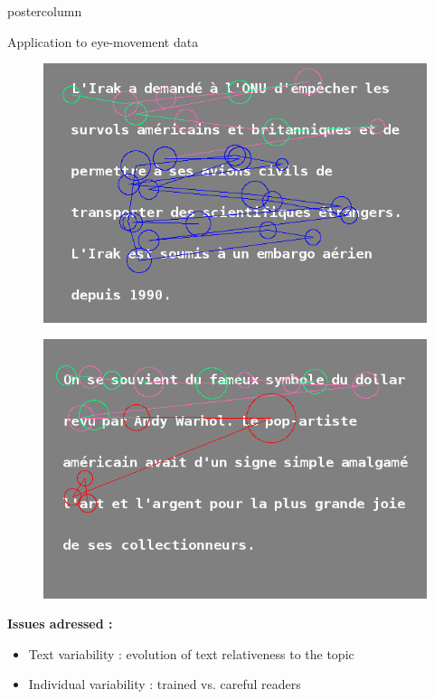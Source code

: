 \documentclass[final,hyperref={pdfpagelabels=false}]{beamer}
\begin{document}
\begin{frame}
\begin{columns}
\begin{column}{.50\textwidth}
\begin{beamercolorbox}[center,wd=\textwidth]{postercolumn}
\begin{minipage}[T]{.98\textwidth}
{\begin{block}{Application to eye-movement data}
\begin{minipage}{0.47\textwidth}
\begin{figure}[h]
                        \centering
                        \includegraphics[width=18cm]{scanpath-careful-reader-subj-8-text-14.png}
                    \end{figure}
                \end{minipage} \hfill
                \begin{minipage}{0.47\textwidth}
                    \begin{figure}[h]
                        \centering
                        \includegraphics[width=18cm]{scanpath-trained-reader-subj-13-text-5.png}
                    \end{figure}
                \end{minipage}
                \vskip 0.5cm
                \textbf{Issues adressed :}
                \begin{itemize}
                    \item[\bullet] Text variability : evolution of text relativeness to the topic
                    \item[\bullet] Individual variability : trained vs. careful readers
                \end{itemize}
            \end{block}

}
\end{minipage}
\end{beamercolorbox}
\end{column}
\end{columns}
\end{frame}
\end{document}
